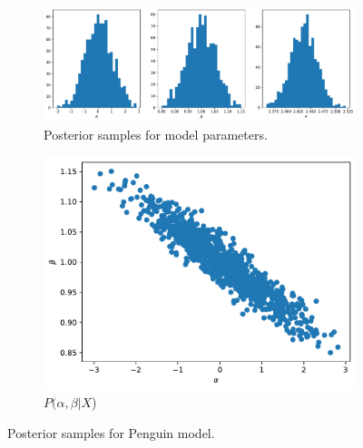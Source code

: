 \begin{figure}[H]
    \centering
        \begin{subfigure}[t]{\0.8\textwidth}
            \includegraphics[width=\textwidth]{data/05_reporting/problem_set_2/posterior_samples.pdf}
            \caption{Posterior samples for model parameters.}
            \label{posterior-a}
     \end{subfigure}
    \begin{subfigure}[t]{0.4\textwidth}
        \includegraphics[width=\textwidth]{data/05_reporting/problem_set_2/bivariate_posterior_samples.pdf}
        \caption{$P(\alpha, \beta | X$)}
        \label{posterior-b}
    \end{subfigure}
        \caption{Posterior samples for Penguin model.}
        \label{fig:posterior-samples}
\end{figure}